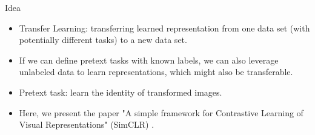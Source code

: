 \documentclass[xcolor=pdftex,dvipsnames,table]{beamer}
\begin{document}
\begin{frame}{Idea}
\begin{itemize}
\item Transfer Learning: transferring learned representation from one data set (with potentially different tasks) to a new data set. 
\item If we can define pretext tasks with known labels, we can also leverage unlabeled data to learn representations, which might also be transferable. 
\item Pretext task: learn the identity of transformed images. 
\item Here, we present the paper "A simple framework for Contrastive Learning of Visual Representations" (SimCLR) \cite{Chen2020}. 
\end{itemize}
\end{frame}
\end{document}
